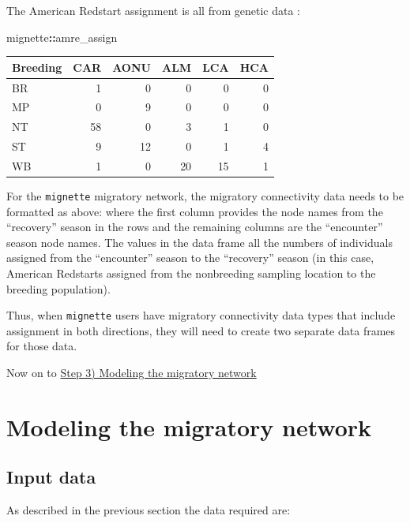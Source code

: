 \documentclass[
]{book}
\newenvironment{Shaded}{\begin{snugshade}}{\end{snugshade}}
\newcommand{\NormalTok}[1]{#1}
\newcommand{\SpecialCharTok}[1]{\textcolor[rgb]{0.81,0.36,0.00}{\textbf{#1}}}
\begin{document}
The American Redstart assignment is all from genetic data \citep{desaix2023low}:

\begin{Shaded}
\begin{Highlighting}[]
\NormalTok{mignette}\SpecialCharTok{::}\NormalTok{amre\_assign}
\end{Highlighting}
\end{Shaded}

\begin{tabular}{l|r|r|r|r|r}
\hline
Breeding & CAR & AONU & ALM & LCA & HCA\\
\hline
BR & 1 & 0 & 0 & 0 & 0\\
\hline
MP & 0 & 9 & 0 & 0 & 0\\
\hline
NT & 58 & 0 & 3 & 1 & 0\\
\hline
ST & 9 & 12 & 0 & 1 & 4\\
\hline
WB & 1 & 0 & 20 & 15 & 1\\
\hline
\end{tabular}

For the \texttt{mignette} migratory network, the migratory connectivity data needs to be formatted as above: where the first column provides the node names from the ``recovery'' season in the rows and the remaining columns are the ``encounter'' season node names. The values in the data frame all the numbers of individuals assigned from the ``encounter'' season to the ``recovery'' season (in this case, American Redstarts assigned from the nonbreeding sampling location to the breeding population).

Thus, when \texttt{mignette} users have migratory connectivity data types that include assignment in both directions, they will need to create two separate data frames for those data.

Now on to \protect\hyperlink{model}{Step 3) Modeling the migratory network}

\hypertarget{model}{%
\chapter{Modeling the migratory network}\label{model}}

\hypertarget{input-data}{%
\section{Input data}\label{input-data}}

As described in the previous section the data required are:
\end{document}
